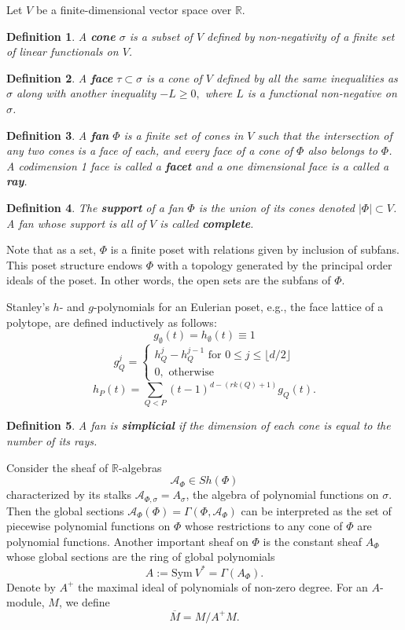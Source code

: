 \documentclass[12pt,leqno,twoside]{amsart}
\newcommand{\R}{\mathbb{R}}
\newtheorem*{defn}{Definition}
\begin{document}
Let $V$ be a finite-dimensional vector space over $\R.$

\begin{defn} A \textbf{cone} $\sigma$ is a subset of $V$ defined by non-negativity of a finite set of linear functionals on $V$.
\end{defn}

\begin{defn} A \textbf{face} $\tau\subset\sigma$ is a cone of $V$ defined by all the same inequalities as $\sigma$ along with another inequality $-L\geq0,$ where $L$ is a functional non-negative on $\sigma$.
\end{defn}

\begin{defn} A \textbf{fan} $\Phi$ is a finite set of cones in $V$ such that the intersection of any two cones is a face of each, and every face of a cone of $\Phi$ also belongs to $\Phi$. A codimension 1 face is called a \textbf{facet} and a one dimensional face is a called a \textbf{ray}.
\end{defn}

\begin{defn} {The \textbf{support} of a fan $\Phi$ is the union of its cones denoted $|\Phi|\subset V$. A fan whose support is all of $V$ is called \textbf{complete}}.
\end{defn}

Note that as a set, $\Phi$ is a finite poset with relations given by inclusion of subfans. This poset structure endows $\Phi$ with a topology generated by the principal order ideals of the poset. In other words, the open sets are the subfans of $\Phi$.

Stanley's $h$- and $g$-polynomials for an Eulerian poset, e.g., the face lattice of a polytope, are defined inductively as follows:
\[g_\emptyset(t)=h_\emptyset(t)\equiv1\]
\[g^j_Q=\begin{cases}
                h_Q^j-h_Q^{j-1} \text{ for } 0\leq j\leq \lfloor d/2\rfloor  \\
                0,  \text{ otherwise}
                 \end{cases}\]
\[h_P(t)=\sum_{Q<P}(t-1)^{d-(rk(Q)+1)}g_Q(t).\]


\begin{defn} A fan is \textbf{simplicial} if the dimension of each cone is equal to the number of its rays.
\end{defn}

Consider the sheaf of $\R$-algebras \[\mathcal{A}_\Phi\in Sh(\Phi)\] characterized by its stalks $\mathcal{A}_{\Phi,\sigma}=A_\sigma$, the algebra of polynomial functions on $\sigma$. Then the global sections $\mathcal{A}_\Phi(\Phi)=\Gamma(\Phi,\mathcal{A}_\Phi)$ can be interpreted as the set of piecewise polynomial functions on $\Phi$ whose restrictions to any cone of $\Phi$ are polynomial functions. Another important sheaf on $\Phi$ is the constant sheaf $A_\Phi$ whose global sections are the ring of global polynomials \[A:=\text{Sym}\ V^*=\Gamma(A_\Phi).\] Denote by $A^+$ the maximal ideal of polynomials of non-zero degree. For an $A$-module, $M$, we define \[\overline{M}=M/A^+M.\]
\end{document}
